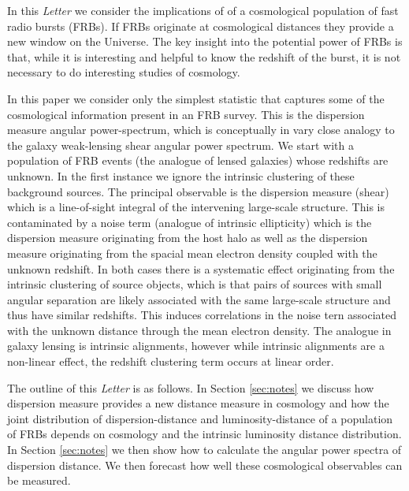 \documentclass[onecolumn,prd,noshowpacs,nofootinbib,amsmath,amssymb]{revtex4}
\begin{document}
In this \emph{ Letter} we consider the implications of of a cosmological population of fast radio bursts (FRBs). 
If FRBs originate at cosmological distances they provide a new window on the Universe. The key insight into the potential power of FRBs is that, while it is interesting and helpful to know the redshift of the burst, it is not necessary to do interesting studies of cosmology.

In this paper we consider only the simplest statistic that captures some of
the cosmological information present in an FRB survey.  This is the dispersion
measure angular power-spectrum, which is conceptually in vary close analogy to
the galaxy weak-lensing shear angular power spectrum. We start with a
population of FRB events (the analogue of lensed galaxies) whose redshifts are
unknown.  In the first instance we ignore the intrinsic clustering of these
background sources.  The principal observable is the dispersion measure
(shear) which is a line-of-sight integral of the intervening large-scale
structure.  This is contaminated by a noise term (analogue of intrinsic
ellipticity) which is the dispersion
measure originating from the host halo as well as the dispersion measure
originating from the spacial mean electron density coupled with the unknown
redshift.  In both cases there is a systematic effect originating from the
intrinsic clustering of source objects, which is that pairs of sources with
small angular separation are likely associated with the same large-scale
structure and thus have similar redshifts.  This induces correlations in the
noise tern associated with the unknown distance through the mean electron
density. The analogue in galaxy lensing is intrinsic alignments, however while
intrinsic alignments are a non-linear effect, the redshift clustering term occurs
at linear order.

The outline of this \emph{Letter} is as follows. In Section \ref{sec:notes} we discuss how dispersion measure provides a new distance measure in cosmology and how the joint distribution of dispersion-distance and luminosity-distance of a population of FRBs depends on cosmology and the intrinsic luminosity distance distribution.   In Section \ref{sec:notes} we then show how to calculate the angular power spectra of dispersion distance.  We then forecast how well these cosmological observables can be measured.


%
%
\end{document}
